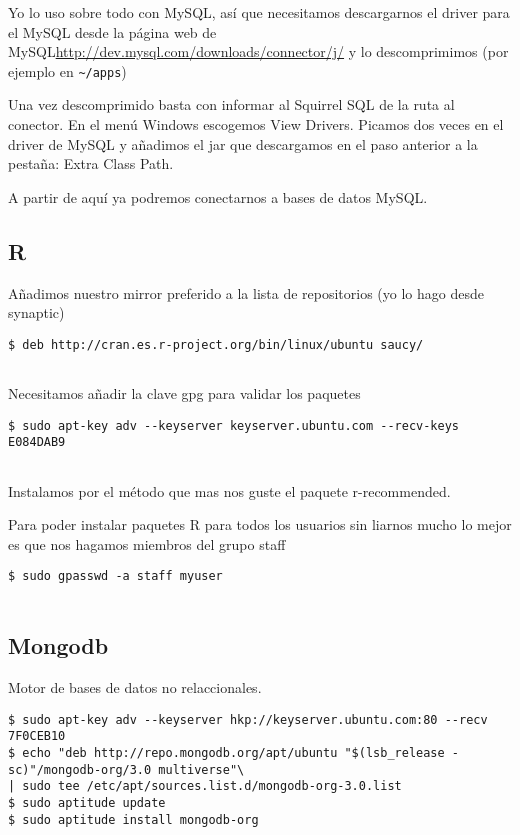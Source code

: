 Yo lo uso sobre todo con MySQL, así que necesitamos descargarnos el
driver para el MySQL desde la página web de
MySQL\url{http://dev.mysql.com/downloads/connector/j/} y lo
descomprimimos (por ejemplo en \texttt{\textasciitilde{}/apps})

Una vez descomprimido basta con informar al Squirrel SQL de la ruta al
conector. En el menú Windows escogemos View Drivers. Picamos dos veces
en el driver de MySQL y añadimos el jar que descargamos en el paso
anterior a la pestaña: Extra Class Path.

A partir de aquí ya podremos conectarnos a bases de datos MySQL.

\subsection{R}\label{r}

Añadimos nuestro mirror preferido a la lista de repositorios (yo lo hago
desde synaptic)

\begin{verbatim}
$ deb http://cran.es.r-project.org/bin/linux/ubuntu saucy/
      
\end{verbatim}

Necesitamos añadir la clave gpg para validar los paquetes

\begin{verbatim}
$ sudo apt-key adv --keyserver keyserver.ubuntu.com --recv-keys E084DAB9
      
\end{verbatim}

Instalamos por el método que mas nos guste el paquete r-recommended.

Para poder instalar paquetes R para todos los usuarios sin liarnos mucho
lo mejor es que nos hagamos miembros del grupo staff

\begin{verbatim}
$ sudo gpasswd -a staff myuser
      
\end{verbatim}

\subsection{Mongodb}\label{mongodb}

Motor de bases de datos no relaccionales.

\begin{verbatim}
$ sudo apt-key adv --keyserver hkp://keyserver.ubuntu.com:80 --recv 7F0CEB10
$ echo "deb http://repo.mongodb.org/apt/ubuntu "$(lsb_release -sc)"/mongodb-org/3.0 multiverse"\
| sudo tee /etc/apt/sources.list.d/mongodb-org-3.0.list
$ sudo aptitude update
$ sudo aptitude install mongodb-org
      
\end{verbatim}

